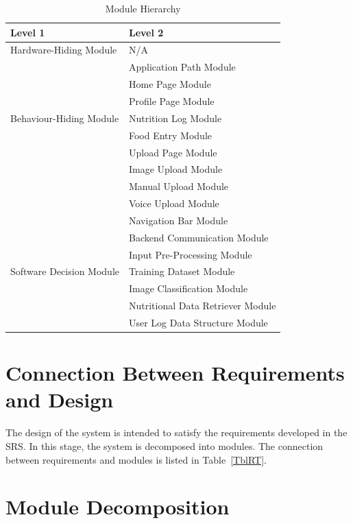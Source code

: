 \documentclass[12pt, titlepage]{article}
\begin{document}
\begin{table}[H]
\centering
\begin{tabular}{p{} p{}}
\toprule
\textbf{Level 1} & \textbf{Level 2}\\
\midrule

{Hardware-Hiding Module} & N/A \\
\midrule

\multirow{7}{0.3\textwidth}{Behaviour-Hiding Module} & Application Path Module\\
& Home Page Module\\
& Profile Page Module\\
& Nutrition Log Module\\
& Food Entry Module \\
& Upload Page Module\\
& Image Upload Module\\
& Manual Upload Module \\
& Voice Upload Module \\
& Navigation Bar Module\\
& Backend Communication Module\\ 
\midrule

\multirow{3}{0.3\textwidth}{Software Decision Module} & Input Pre-Processing Module\\
& Training Dataset Module\\
& Image Classification Module\\
& Nutritional Data Retriever Module\\
& User Log Data Structure Module\\
\bottomrule

\end{tabular}
\caption{Module Hierarchy}
\label{TblMH}
\end{table}

\section{Connection Between Requirements and Design} \label{SecConnection}

The design of the system is intended to satisfy the requirements developed in
the SRS. In this stage, the system is decomposed into modules. The connection
between requirements and modules is listed in Table~\ref{TblRT}.

\section{Module Decomposition} \label{SecMD}
\end{document}
